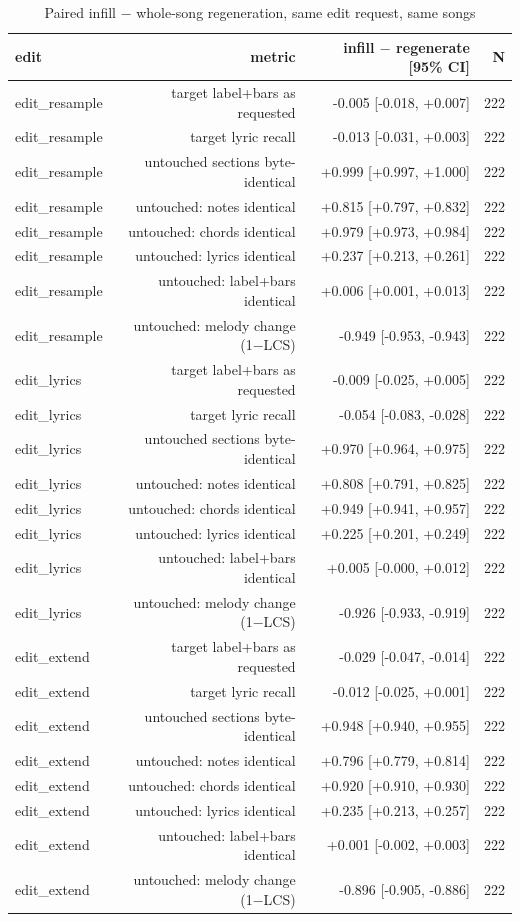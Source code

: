 \begin{table}[t]
\centering
\small
\begin{tabular}{lrrr}
\toprule
edit & metric & infill $-$ regenerate [95\% CI] & N \\
\midrule
edit\_resample & target label+bars as requested & -0.005 [-0.018, +0.007] & 222 \\
edit\_resample & target lyric recall & -0.013 [-0.031, +0.003] & 222 \\
edit\_resample & untouched sections byte-identical & +0.999 [+0.997, +1.000] & 222 \\
edit\_resample & untouched: notes identical & +0.815 [+0.797, +0.832] & 222 \\
edit\_resample & untouched: chords identical & +0.979 [+0.973, +0.984] & 222 \\
edit\_resample & untouched: lyrics identical & +0.237 [+0.213, +0.261] & 222 \\
edit\_resample & untouched: label+bars identical & +0.006 [+0.001, +0.013] & 222 \\
edit\_resample & untouched: melody change (1$-$LCS) & -0.949 [-0.953, -0.943] & 222 \\
edit\_lyrics & target label+bars as requested & -0.009 [-0.025, +0.005] & 222 \\
edit\_lyrics & target lyric recall & -0.054 [-0.083, -0.028] & 222 \\
edit\_lyrics & untouched sections byte-identical & +0.970 [+0.964, +0.975] & 222 \\
edit\_lyrics & untouched: notes identical & +0.808 [+0.791, +0.825] & 222 \\
edit\_lyrics & untouched: chords identical & +0.949 [+0.941, +0.957] & 222 \\
edit\_lyrics & untouched: lyrics identical & +0.225 [+0.201, +0.249] & 222 \\
edit\_lyrics & untouched: label+bars identical & +0.005 [-0.000, +0.012] & 222 \\
edit\_lyrics & untouched: melody change (1$-$LCS) & -0.926 [-0.933, -0.919] & 222 \\
edit\_extend & target label+bars as requested & -0.029 [-0.047, -0.014] & 222 \\
edit\_extend & target lyric recall & -0.012 [-0.025, +0.001] & 222 \\
edit\_extend & untouched sections byte-identical & +0.948 [+0.940, +0.955] & 222 \\
edit\_extend & untouched: notes identical & +0.796 [+0.779, +0.814] & 222 \\
edit\_extend & untouched: chords identical & +0.920 [+0.910, +0.930] & 222 \\
edit\_extend & untouched: lyrics identical & +0.235 [+0.213, +0.257] & 222 \\
edit\_extend & untouched: label+bars identical & +0.001 [-0.002, +0.003] & 222 \\
edit\_extend & untouched: melody change (1$-$LCS) & -0.896 [-0.905, -0.886] & 222 \\
\bottomrule
\end{tabular}
\caption{Paired infill $-$ whole-song regeneration, same edit request, same songs}
\label{tab:infill_vs_regen}
\end{table}
